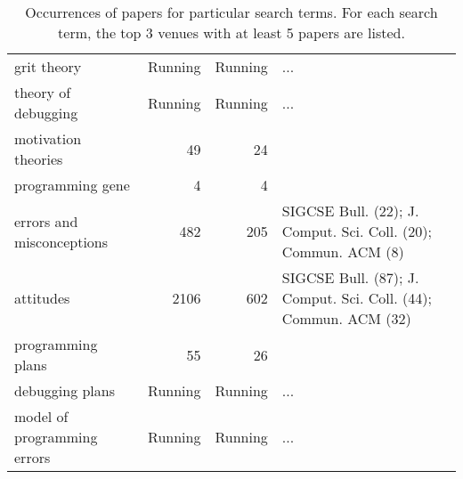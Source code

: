 \begin{table*}[t]
\begin{tabular}{lrrp{6cm}}
grit theory & Running & Running & ... \\
theory of debugging & Running & Running & ... \\
motivation theories & 49 & 24 &  \\
programming gene & 4 & 4 &  \\
errors and misconceptions & 482 & 205 & SIGCSE Bull. (22); J. Comput. Sci. Coll. (20); Commun. ACM (8) \\
attitudes & 2106 & 602 & SIGCSE Bull. (87); J. Comput. Sci. Coll. (44); Commun. ACM (32) \\
programming plans & 55 & 26 &  \\
debugging plans & Running & Running & ... \\
model of programming errors & Running & Running & ... \\
\end{tabular}
\caption{Occurrences of papers for particular search terms. For each search term, the top 3 venues with at least 5 papers are listed.}
\end{table*}